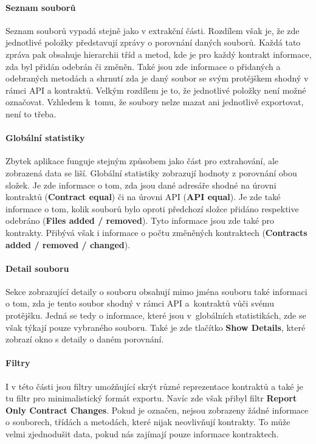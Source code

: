 		\paragraph{Seznam souborů}
			Seznam souborů vypadá stejně jako v extrakční části. Rozdílem však je, že zde jednotlivé položky představují zprávy o porovnání daných souborů. Každá tato zpráva pak obsahuje hierarchii tříd a metod, kde je pro každý kontrakt informace, zda byl přidán odebrán či změněn. Také jsou zde informace o přidaných a odebraných metodách a shrnutí zda je daný soubor se svým protějškem shodný v rámci API a kontraktů. Velkým rozdílem je to, že jednotlivé položky není možné označovat. Vzhledem k~tomu, že soubory nelze mazat ani jednotlivě exportovat, není to třeba.
		
		\paragraph{Globální statistiky}
			Zbytek aplikace funguje stejným způsobem jako část pro extrahování, ale zobrazená data se liší. Globální statistiky zobrazují hodnoty z porovnání obou složek. Je zde informace o tom, zda jsou dané adresáře shodné na úrovni kontraktů (\textbf{Contract equal}) či na úrovni API (\textbf{API equal}). Je zde také informace o tom, kolik souborů bylo oproti předchozí složce přidáno respektive odebráno (\textbf{Files added / removed}). Tyto informace jsou zde také pro kontrakty. Přibývá však i informace o počtu změněných kontraktech (\textbf{Contracts added / removed / changed}).\\
		
		\paragraph{Detail souboru}
			Sekce zobrazující detaily o souboru obsahují mimo jména souboru také informaci o tom, zda je tento soubor shodný v rámci API a~kontraktů vůči svému protějšku. Jedná se tedy o informace, které jsou v~globálních statistikách, zde se však týkají pouze vybraného souboru. Také je zde tlačítko \textbf{Show Details}, které zobrazí okno s detaily o daném porovnání.\\
				
		\paragraph{Filtry}
			I v této části jsou filtry umožňující skrýt různé reprezentace kontraktů a také je tu filtr pro minimalistický formát exportu. Navíc zde však přibyl filtr \textbf{Report Only Contract Changes}. Pokud je označen, nejsou zobrazeny žádné informace o souborech, třídách a metodách, které nijak neovlivňují kontrakty. To může velmi zjednodušit data, pokud nás zajímají pouze informace  kontraktech.\\
			
